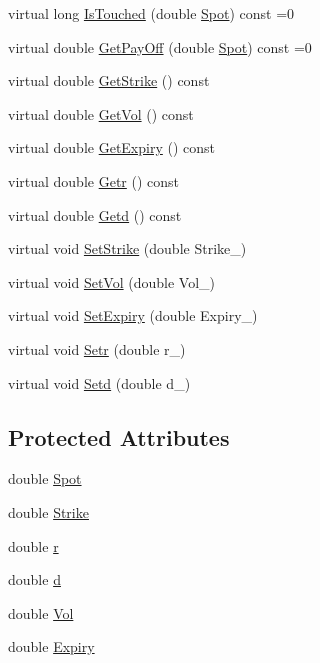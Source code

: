 \begin{DoxyCompactItemize}
\item 
virtual long \hyperlink{classMyOption_1_1Option_ade57d2fcb9f22f3c2a57d75f55444c33}{Is\+Touched} (double \hyperlink{classMyOption_1_1Option_a6c6f01d75cde7e92d16a6d8d6f331a1d}{Spot}) const =0
\item 
virtual double \hyperlink{classMyOption_1_1Option_a4b6b84dc485153ffadfb32afa9bb52f3}{Get\+Pay\+Off} (double \hyperlink{classMyOption_1_1Option_a6c6f01d75cde7e92d16a6d8d6f331a1d}{Spot}) const =0
\item 
virtual double \hyperlink{classMyOption_1_1Option_a3ceb4460631f043e5fa8c06f9ee3bde2}{Get\+Strike} () const
\item 
virtual double \hyperlink{classMyOption_1_1Option_ae039666c1ba4084374f825163dddee35}{Get\+Vol} () const
\item 
virtual double \hyperlink{classMyOption_1_1Option_a15ca3c97b0cdcdb1e2ab424243fcabb3}{Get\+Expiry} () const
\item 
virtual double \hyperlink{classMyOption_1_1Option_a4dc076bd6fbc9877aadf1148c42832d2}{Getr} () const
\item 
virtual double \hyperlink{classMyOption_1_1Option_a05144da1201808f0d6c158e3e45efc61}{Getd} () const
\item 
virtual void \hyperlink{classMyOption_1_1Option_a66027e8726af31f88787412b605853db}{Set\+Strike} (double Strike\+\_\+)
\item 
virtual void \hyperlink{classMyOption_1_1Option_a718b529588c5c949dccf71a28939ea25}{Set\+Vol} (double Vol\+\_\+)
\item 
virtual void \hyperlink{classMyOption_1_1Option_a3d822c6f5d051ed6d02c72e3a0e7b93c}{Set\+Expiry} (double Expiry\+\_\+)
\item 
virtual void \hyperlink{classMyOption_1_1Option_ad39bb9124a47fc09e1962799f49e5367}{Setr} (double r\+\_\+)
\item 
virtual void \hyperlink{classMyOption_1_1Option_a383adfb2fada8d93eed4afac50c53955}{Setd} (double d\+\_\+)
\end{DoxyCompactItemize}
\subsection*{Protected Attributes}
\begin{DoxyCompactItemize}
\item 
double \hyperlink{classMyOption_1_1Option_a6c6f01d75cde7e92d16a6d8d6f331a1d}{Spot}
\item 
double \hyperlink{classMyOption_1_1Option_a3033c483588ce26b175280c7f9dee8d1}{Strike}
\item 
double \hyperlink{classMyOption_1_1Option_aa8cb250427dece65ea49255d4102cc8d}{r}
\item 
double \hyperlink{classMyOption_1_1Option_a500979f4b32262594d895c4a83b58d1d}{d}
\item 
double \hyperlink{classMyOption_1_1Option_a5d6002c14b335c782873bf1437113513}{Vol}
\item 
double \hyperlink{classMyOption_1_1Option_ac1adacb417fede41d151b9cda05bcb3d}{Expiry}
\end{DoxyCompactItemize}


